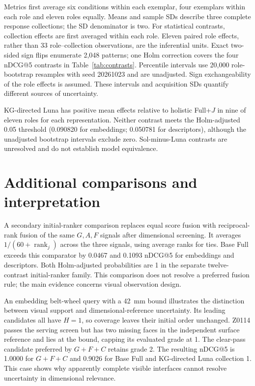 \documentclass[10pt,a4paper]{article}
\begin{document}
Metrics first average six conditions within each exemplar, four exemplars
within each role and eleven roles equally. Means and sample SDs describe three
complete response collections; the SD denominator is two. For statistical
contrasts, collection effects are first averaged within each role. Eleven paired
role effects, rather than 33 role--collection observations, are the inferential
units. Exact two-sided sign flips enumerate 2,048 patterns; one Holm correction
covers the four nDCG@5 contrasts in Table~\ref{tab:contrasts}. Percentile intervals
use 20,000 role-bootstrap resamples with seed 20261023 and are unadjusted.
Sign exchangeability of the role effects is assumed. These intervals and
acquisition SDs quantify different sources of uncertainty.

\begin{table}[htbp]\centering\small
\resizebox{\textwidth}{!}{}
\caption{Primary paired contrasts from three-collection role means. Intervals are unadjusted 95\% role-bootstrap intervals. Holm correction covers the four exact sign-flip tests. W/T/L counts role wins, ties and losses.}
\label{tab:contrasts}
\end{table}

KG-directed Luna has positive mean effects relative to holistic Full+$J$ in
nine of eleven roles for each representation. Neither contrast meets the
Holm-adjusted 0.05 threshold (0.090820 for embeddings; 0.050781 for descriptors),
although the unadjusted bootstrap intervals exclude zero. Sol-minus-Luna
contrasts are unresolved and do not establish model equivalence.

\section{Additional comparisons and interpretation}

A secondary initial-ranker comparison replaces equal score fusion with
reciprocal-rank fusion of the same $G,A,F$ signals after dimensional screening.
It averages $1/(60+\operatorname{rank}_j)$ across the three signals, using average
ranks for ties. Base Full exceeds this comparator by 0.0467 and 0.1093 nDCG@5
for embeddings and descriptors. Both Holm-adjusted probabilities are 1 in the
separate twelve-contrast initial-ranker family. This comparison does not resolve
a preferred fusion rule; the main evidence concerns visual observation design.

An embedding belt-wheel query with a 42~mm bound illustrates the distinction
between visual support and dimensional-reference uncertainty. Its leading
candidates all have $H=1$, so coverage leaves their initial order unchanged.
Z0114 passes the serving screen but has two missing faces in the independent
surface reference and lies at the bound, capping its evaluated grade at 1.
The clear-pass candidate preferred by $G+F+C$ retains grade 2. The resulting
nDCG@5 is 1.0000 for $G+F+C$ and 0.9026 for Base Full and KG-directed Luna
collection 1. This case shows why apparently complete visible interfaces cannot
resolve uncertainty in dimensional relevance.
\end{document}

